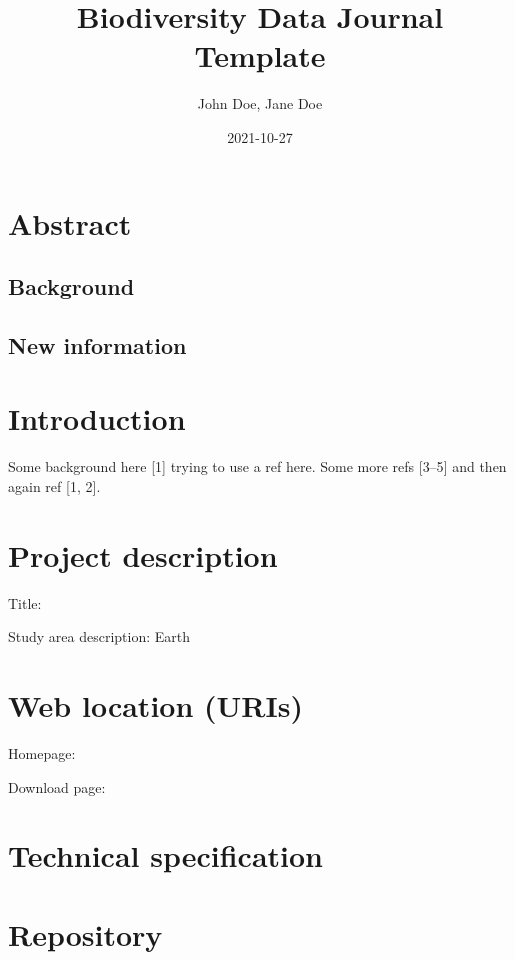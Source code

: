 \documentclass[
]{article}
\title{Biodiversity Data Journal Template}
\author{John Doe, Jane Doe}
\date{2021-10-27}
\begin{document}
\maketitle

\hypertarget{abstract}{%
\section{Abstract}\label{abstract}}

\hypertarget{background}{%
\subsection{Background}\label{background}}

\hypertarget{new-information}{%
\subsection{New information}\label{new-information}}

\hypertarget{introduction}{%
\section{Introduction}\label{introduction}}

Some background here {[}1{]} trying to use a ref here. Some more refs
{[}3--5{]} and then again ref {[}1, 2{]}.

\hypertarget{project-description}{%
\section{Project description}\label{project-description}}

Title:

Study area description: Earth

\hypertarget{web-location-uris}{%
\section{Web location (URIs)}\label{web-location-uris}}

Homepage:

Download page:

\hypertarget{technical-specification}{%
\section{Technical specification}\label{technical-specification}}

\hypertarget{repository}{%
\section{Repository}\label{repository}}
\end{document}
